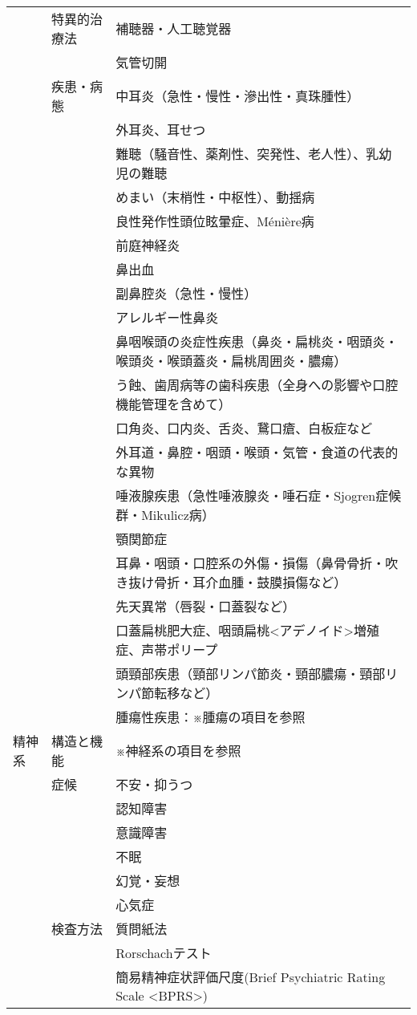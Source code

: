\documentclass[
]{ltjsarticle}
\begin{document}
\begin{xltabular}{\linewidth}{XXX}
 & 特異的治療法 & 補聴器・人工聴覚器 \\
 &  & 気管切開 \\
 & 疾患・病態 & 中耳炎（急性・慢性・滲出性・真珠腫性） \\
 &  & 外耳炎、耳せつ \\
 &  & 難聴（騒音性、薬剤性、突発性、老人性）、乳幼児の難聴 \\
 &  & めまい（末梢性・中枢性）、動揺病 \\
 &  & 良性発作性頭位眩暈症、Ménière病 \\
 &  & 前庭神経炎 \\
 &  & 鼻出血 \\
 &  & 副鼻腔炎（急性・慢性） \\
 &  & アレルギー性鼻炎 \\
 &  & 鼻咽喉頭の炎症性疾患（鼻炎・扁桃炎・咽頭炎・喉頭炎・喉頭蓋炎・扁桃周囲炎・膿瘍） \\
 &  & う蝕、歯周病等の歯科疾患（全身への影響や口腔機能管理を含めて） \\
 &  & 口角炎、口内炎、舌炎、鵞口瘡、白板症など \\
 &  & 外耳道・鼻腔・咽頭・喉頭・気管・食道の代表的な異物 \\
 &  & 唾液腺疾患（急性唾液腺炎・唾石症・Sjogren症候群・Mikulicz病） \\
 &  & 顎関節症 \\
 &  & 耳鼻・咽頭・口腔系の外傷・損傷（鼻骨骨折・吹き抜け骨折・耳介血腫・鼓膜損傷など） \\
 &  & 先天異常（唇裂・口蓋裂など） \\
 &  & 口蓋扁桃肥大症、咽頭扁桃<アデノイド>増殖症、声帯ポリープ \\
 &  & 頭頸部疾患（頸部リンパ節炎・頸部膿瘍・頸部リンパ節転移など） \\
 &  & 腫瘍性疾患：※腫瘍の項目を参照 \\
精神系 & 構造と機能 & ※神経系の項目を参照 \\
 & 症候 & 不安・抑うつ \\
 &  & 認知障害 \\
 &  & 意識障害 \\
 &  & 不眠 \\
 &  & 幻覚・妄想 \\
 &  & 心気症 \\
 & 検査方法 & 質問紙法 \\
 &  & Rorschachテスト \\
 &  & 簡易精神症状評価尺度(Brief Psychiatric Rating Scale <BPRS>) \\

\end{xltabular}
\end{document}
